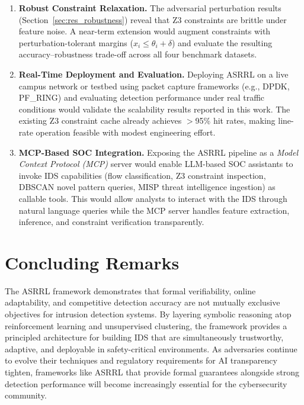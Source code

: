 \documentclass[12pt, letterpaper, oneside]{report}
\newcommand{\ASRRL}{\textsc{ASRRL}}
\begin{document}
\begin{enumerate}
    \item \textbf{Robust Constraint Relaxation.} The adversarial perturbation results (Section~\ref{sec:res_robustness}) reveal that Z3 constraints are brittle under feature noise. A near-term extension would augment constraints with perturbation-tolerant margins ($x_i \leq \theta_i + \delta$) and evaluate the resulting accuracy--robustness trade-off across all four benchmark datasets.

    \item \textbf{Real-Time Deployment and Evaluation.} Deploying \ASRRL{} on a live campus network or testbed using packet capture frameworks (e.g., DPDK, PF\_RING) and evaluating detection performance under real traffic conditions would validate the scalability results reported in this work. The existing Z3 constraint cache already achieves $>$95\% hit rates, making line-rate operation feasible with modest engineering effort.

    \item \textbf{MCP-Based SOC Integration.} Exposing the \ASRRL{} pipeline as a \emph{Model Context Protocol (MCP)} server would enable LLM-based SOC assistants to invoke IDS capabilities (flow classification, Z3 constraint inspection, DBSCAN novel pattern queries, MISP threat intelligence ingestion) as callable tools. This would allow analysts to interact with the IDS through natural language queries while the MCP server handles feature extraction, inference, and constraint verification transparently.
\end{enumerate}

\section{Concluding Remarks}

The \ASRRL{} framework demonstrates that formal verifiability, online adaptability, and competitive detection accuracy are not mutually exclusive objectives for intrusion detection systems. By layering symbolic reasoning atop reinforcement learning and unsupervised clustering, the framework provides a principled architecture for building IDS that are simultaneously trustworthy, adaptive, and deployable in safety-critical environments. As adversaries continue to evolve their techniques and regulatory requirements for AI transparency tighten, frameworks like \ASRRL{} that provide formal guarantees alongside strong detection performance will become increasingly essential for the cybersecurity community.
\end{document}
